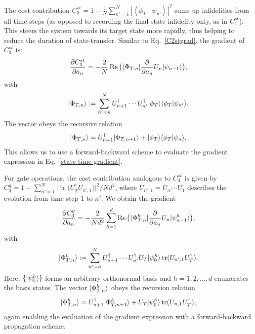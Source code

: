 The cost contribution $C_3^{st}=1-\frac{1}{N}\sum_{n'=1}^N \left|\left\langle\phi_{T} \mid \psi_{n'}\right\rangle\right|^{2}$ sums up infidelities from all time steps (as opposed to recording the final state infidelity only, as in $C_1^{st}$). This steers the system towards its target state more rapidly, thus helping to reduce the duration of state-transfer. Similar to Eq.\ \eqref{C2stgrad}, the gradient of $C_3^{st}$ is:
\begin{equation}
\begin{aligned}
\label{state time gradient}
  \frac{\partial C_3^{st} }{\partial a_{n}}
  &=-\frac{2}{N}\operatorname{Re}\big(\langle \Phi_{T,n}|\frac {\partial }{\partial a_{n}}U_n|\psi_{n-1}\rangle\big) ,\\
\end{aligned}
\end{equation}
with 
\begin{equation}
    |\Phi_{T,n}\rangle:=\sum_{n'=n}^NU_{n+1}^\dagger \cdots U_{n'}^\dagger|\phi_T\rangle\langle\phi_{T}|\psi_{n'}\rangle.
\end{equation}
The vector obeys the recursive relation
\begin{equation}
|\Phi_{T,n}\rangle=U^\dagger_{n+1}|\Phi_{T,n+1}\rangle+|\phi_T\rangle\langle\phi_T|\psi_n\rangle.
\end{equation}
This allows us to use a forward-backward scheme to evaluate the gradient expression in Eq.\ \eqref{state time gradient}.

For gate operations, the cost contribution analogous to $C_3^{st}$ is given by $C_3^{ g}=1- \sum_{n'=1}^N\big|\operatorname{tr}\big(U_T^\dagger  U_{n',1}\big)\big|^{2}/Nd^2$, where $U_{n',1}=U_{n'}\cdots U_1$ describes the evolution from time step 1 to $n'$. We obtain the gradient
\begin{equation}
  \frac{\partial C_3^{ g} }{\partial a_{n}}=
  -\frac{2}{Nd^2}\sum_{h=1}^d \operatorname{Re}  \big(\langle \Phi_{T,n}^h|\frac {\partial }{\partial a_{n}}U_n|\psi_{n-1}^h\rangle\big),
\end{equation}
with
\begin{equation}
|\Phi_{T,n}^h\rangle:=\sum_{n'=n}^N U_{n+1}^\dagger \cdots U_{n'}^\dagger U_T|\psi_0^h\rangle \operatorname{tr}( U_{n',1}U_T^{\dagger}).
\end{equation}
Here, $\{|\psi_0^h\rangle\}$ forms an arbitrary orthonormal basis and 
$h=1,2,\ldots,d$ enumerates the basis states. The vector $|\Phi_{T,n}^h\rangle$ obeys the recursion relation
\begin{equation}
|\Phi_{T,n}^h\rangle=U_{n+1}^\dagger|\Phi_{T,n+1}^h\rangle+U_T|\psi_0^h\rangle\operatorname{tr}( U_{n,1}U_T^{\dagger}),
\end{equation}
again enabling the evaluation of the gradient expression with a forward-backward propagation scheme.

